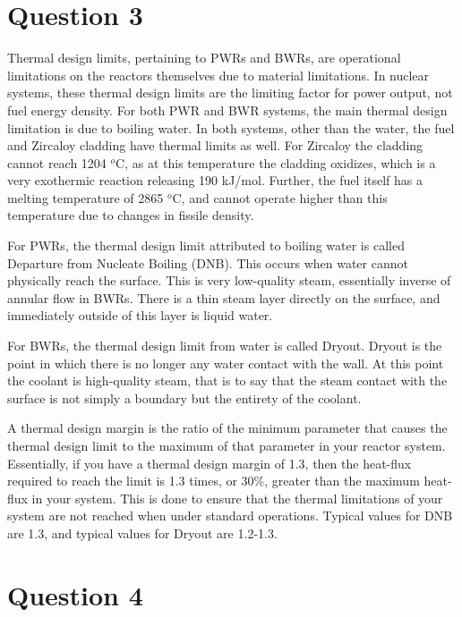 \documentclass{article}
\begin{document}
\section*{Question 3}

Thermal design limits, pertaining to PWRs and BWRs, are operational limitations on the reactors themselves due to material limitations. In nuclear systems, these thermal design limits are the limiting factor for power output, not fuel energy density. For both PWR and BWR systems, the main thermal design limitation is due to boiling water.  In both systems, other than the water, the fuel and Zircaloy cladding have thermal limits as well. For Zircaloy the cladding cannot reach 1204 $^o$C, as at this temperature the cladding oxidizes, which is a very exothermic reaction releasing 190 kJ/mol. Further, the fuel itself has a melting temperature of 2865 $^o$C, and cannot operate higher than this temperature due to changes in fissile density.  

For PWRs, the thermal design limit attributed to boiling water is called Departure from Nucleate Boiling (DNB). This occurs when water cannot physically reach the surface. This is very low-quality steam, essentially inverse of annular flow in BWRs. There is a thin steam layer directly on the surface, and immediately outside of this layer is liquid water.

For BWRs, the thermal design limit from water is called Dryout. Dryout is the point in which there is no longer any water contact with the wall. At this point the coolant is high-quality steam, that is to say that the steam contact with the surface is not simply a boundary but the entirety of the coolant. 

A thermal design margin is the ratio of the minimum parameter that causes the thermal design limit to the maximum of that parameter in your reactor system. Essentially, if you have a thermal design margin of 1.3, then the heat-flux required to reach the limit is 1.3 times, or 30\%, greater than the maximum heat-flux in your system. This is done to ensure that the thermal limitations of your system are not reached when under standard operations. Typical values for DNB are 1.3, and typical values for Dryout are 1.2-1.3. 

\newpage
\section*{Question 4}
\end{document}
